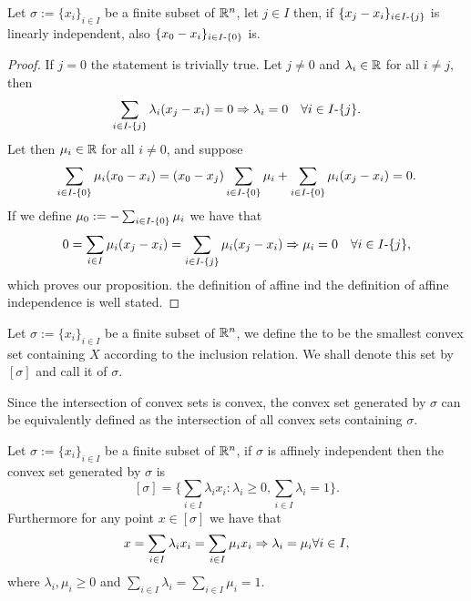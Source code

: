 \documentclass[../1.tex]{subfiles}
\begin{document}
    \begin{prop}
        Let $\sigma := \{x_i\}_{i \in I}$ be a finite subset of $\mathbb{R}^n$, let $j \in I$ then, if $\{ x_j - x_i\}_{i \in I \text{-} \{j\}}$ is linearly independent,
        also $\{ x_0 - x_i\}_{i \in I \text{-} \{0\}}$ is. 
    \end{prop}
    \begin{proof}
        If $j=0$ the statement is trivially true. Let $j \neq 0$ and $\lambda_i \in \mathbb{R}$ for all $i \neq j$, then
        \[ \sum_{i \in I \text{-} \{j\}} \lambda_i (x_j - x_i) = 0 \Rightarrow \lambda_i = 0 \quad \forall i \in I \text{-} \{j\}.\]
        Let then $\mu_i \in \mathbb{R}$ for all $i \neq 0$, and suppose 
        \[ \sum_{i \in I \text{-} \{0\}} \mu_i (x_0 - x_i) = (x_0 - x_j) \sum_{i \in I \text{-} \{0\}} \mu_i + \sum_{i \in I \text{-} \{0\}} \mu_i (x_j - x_i) = 0.\]
        If we define $\mu_0 := -\sum_{i \in I \text{-} \{0\}} \mu_i$ we have that
        \[ 0 = \sum_{i \in I} \mu_i (x_j - x_i) = \sum_{i \in I \text{-} \{j\}} \mu_i (x_j - x_i) \Rightarrow \mu_i = 0 \quad \forall i \in I \text{-} \{j\},\]
        which proves our proposition. the definition of affine ind the definition of affine independence is well stated. \qedhere
    \end{proof}

    \begin{defn}
        Let $\sigma := \{x_i\}_{i \in I}$ be a finite subset of $\mathbb{R}^n$, we define the  to be 
        the smallest convex set containing $X$ according to the inclusion relation. We shall denote this set by $[\sigma]$ and call 
        it  of $\sigma$.
    \end{defn}

    Since the intersection of convex sets is convex, the convex set generated by $\sigma$ can be equivalently defined as the intersection 
    of all convex sets containing $\sigma$.

    \begin{thm}
        Let $\sigma := \{x_i\}_{i \in I}$ be a finite subset of $\mathbb{R}^n$, if $\sigma$ is affinely independent then the convex set generated by $\sigma$ is 
        \[ [\sigma] = \{ \sum_{i \in I} \lambda_i x_i : \lambda_i \geq 0, \sum_{i \in I} \lambda_i = 1\}. \]
        Furthermore for any point $x \in [\sigma]$ we have that
        \[ x = \sum_{i \in I} \lambda_i x_i = \sum_{i \in I} \mu_i x_i \Rightarrow \lambda_i = \mu_i \forall i \in I, \] 
        where $\lambda_i,\mu_i \geq 0$ and $\sum_{i \in I} \lambda_i = \sum_{i \in I} \mu_i =1$.
        \label{thm:1}
    \end{thm}
\end{document}
